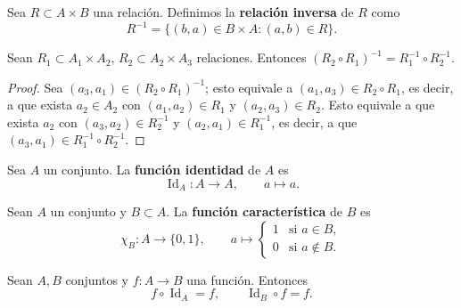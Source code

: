 \documentclass[12pt,a4paper]{book}
\begin{document}
    \begin{definicion}
        Sea $R\subset A\times B$ una relación. Definimos la \textbf{relación inversa} de $R$ como
        \begin{equation*}
            R^{-1} = \{(b,a)\in B\times A : (a,b)\in R\}.
        \end{equation*}
    \end{definicion}

    \begin{proposicion}
        Sean $R_1\subset A_1\times A_2$, $R_2\subset A_2\times A_3$ relaciones. Entonces $(R_2\circ R_1)^{-1} = R_1^{-1}\circ R_2^{-1}$.
    \end{proposicion}

    \begin{proof}
        Sea $(a_3,a_1)\in(R_2\circ R_1)^{-1}$; esto equivale a $(a_1,a_3)\in R_2\circ R_1$, es decir, a que exista $a_2\in A_2$ con $(a_1,a_2)\in R_1$ y $(a_2,a_3)\in R_2$. Esto equivale a que exista $a_2$ con $(a_3,a_2)\in R_2^{-1}$ y $(a_2,a_1)\in R_1^{-1}$, es decir, a que $(a_3,a_1)\in R_1^{-1}\circ R_2^{-1}$.
    \end{proof}

    \begin{definicion}
        Sea $A$ un conjunto. La \textbf{función identidad} de $A$ es
        \begin{equation*}
            \operatorname{Id}_A : A\to A, \qquad a\mapsto a.
        \end{equation*}
    \end{definicion}

    \begin{definicion}
        Sean $A$ un conjunto y $B\subset A$. La \textbf{función característica} de $B$ es
        \begin{equation*}
            \chi_B : A \to \{0,1\}, \qquad a\mapsto \begin{cases} 1 & \text{si } a\in B, \\ 0 & \text{si } a\notin B. \end{cases}
        \end{equation*}
    \end{definicion}

    \begin{lema}
        Sean $A,B$ conjuntos y $f:A\to B$ una función. Entonces
        \begin{equation*}
            f\circ \operatorname{Id}_A = f, \qquad \operatorname{Id}_B \circ f = f.
        \end{equation*}
    \end{lema}
\end{document}

